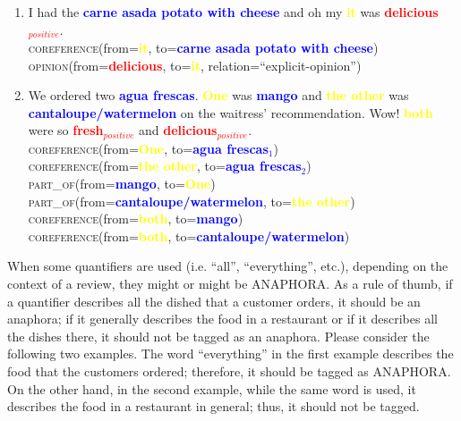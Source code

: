 \documentclass{article}
\begin{document}
\begin{enumerate}[resume]
	\item I had the \textbf{\textcolor{blue}{carne asada potato with cheese}} and oh my \textbf{\textcolor{yellow}{it}} was \textbf{\textcolor{red}{delicious$_{positive}$}}.\\
	\textsc{coreference}(from=\textbf{\textcolor{yellow}{it}}, to=\textbf{\textcolor{blue}{carne asada potato with cheese}})\\
		\textsc{opinion}(from=\textbf{\textcolor{red}{delicious}}, to=\textbf{\textcolor{yellow}{it}}, relation=``explicit-opinion'')
\item We ordered two \textbf{\textcolor{blue}{agua frescas}}. \textbf{\textcolor{yellow}{One}} was  \textbf{\textcolor{blue}{mango}} and \textbf{\textcolor{yellow}{the other}} was 
\textbf{\textcolor{blue}{cantaloupe/watermelon}} on the waitress' recommendation. Wow! 
\textbf{\textcolor{yellow}{both}} were so 
\textbf{\textcolor{red}{fresh$_{positive}$}} and 
\textbf{\textcolor{red}{delicious$_{positive}$}}.\\
\textsc{coreference}(from=\textbf{\textcolor{yellow}{One}}, to=\textbf{\textcolor{blue}{agua frescas$_{1}$}}) \\
\textsc{coreference}(from=\textbf{\textcolor{yellow}{the other}}, to=\textbf{\textcolor{blue}{agua frescas$_{2}$}}) \\
\textsc{part\_of}(from=\textbf{\textcolor{blue}{mango}}, to=\textbf{\textcolor{yellow}{One}})\\
\textsc{part\_of}(from=\textbf{\textcolor{blue}{cantaloupe/watermelon}}, to=\textbf{\textcolor{yellow}{the other}})\\
\textsc{coreference}(from=\textbf{\textcolor{yellow}{both}}, to=\textbf{\textcolor{blue}{mango}}) \\
\textsc{coreference}(from=\textbf{\textcolor{yellow}{both}}, to=\textbf{\textcolor{blue}{cantaloupe/watermelon}}) \\
\end{enumerate}

When some quantifiers are used (i.e. ``all'', ``everything'', etc.), depending on the context of a review, they might or might be ANAPHORA. As a rule of thumb, if a quantifier describes all the dished that a customer orders, it should be an anaphora; if it generally describes the food in a restaurant or if it describes all the dishes there, it should not be tagged as an anaphora. Please consider the following two examples. The word ``everything'' in the first example describes the food that the customers ordered; therefore, it should be tagged as ANAPHORA. On the other hand, in the second example, while the same word is used, it describes the food in a restaurant in general; thus, it should not be tagged.
\end{document}
